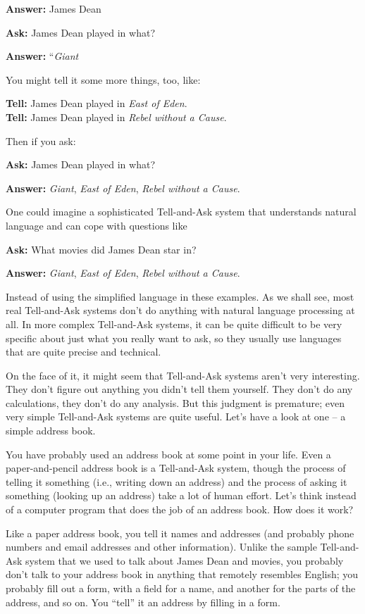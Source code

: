 \textbf{Answer:} James Dean

\textbf{Ask:} James Dean played in what?

\textbf{Answer:} ``\emph{Giant}

You might tell it some more things, too, like:

\textbf{Tell:} James Dean played in \emph{East of Eden}. \\
\textbf{Tell:} James Dean played in \emph{Rebel without a Cause}.

Then if you ask:

\textbf{Ask:} James Dean played in what?

\textbf{Answer:} \emph{Giant}, \emph{East of Eden}, \emph{Rebel without a Cause}.

One could imagine a sophisticated Tell-and-Ask system that understands
natural language and can cope with questions like

\textbf{Ask:} What movies did James Dean star in?

\textbf{Answer:} \emph{Giant}, \emph{East of Eden}, \emph{Rebel without a Cause}.

Instead of using the simplified language in these examples. As we shall
see, most real Tell-and-Ask systems don't do anything with natural
language processing at all. In more complex Tell-and-Ask 
systems, it can be quite difficult to be very specific about just what
you really want to ask, so they usually use languages that are quite
precise and technical.

On the face of it, it might seem that Tell-and-Ask systems aren't very
interesting. They don't figure out anything you didn't tell them
yourself. They don't do any calculations, they don't do any analysis.
But this judgment is premature; even very simple Tell-and-Ask systems
are quite useful. Let's have a look at one -- a simple address book.

You have probably used an address book at some point in your life. Even
a paper-and-pencil 
address book is a Tell-and-Ask system, though the process of telling it
something (i.e., writing down an address) and the process of asking it
something (looking up an address) take a lot of human effort. Let's
think instead of a computer program that does the job of an address
book. How does it work?

Like a paper address book, you tell it names and addresses (and probably
phone numbers and email addresses and other information). Unlike the
sample Tell-and-Ask system that we used to talk about James Dean and
movies, you probably don't talk to your address book in anything that
remotely resembles English; you probably fill out a form, with a field
for a name, and another for the parts of the address, and so on. You
``tell'' it an address by filling in a form.

